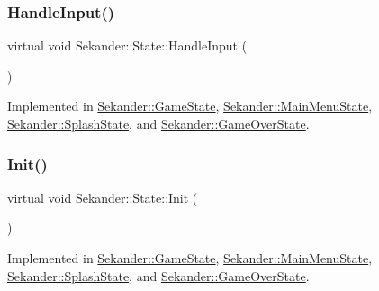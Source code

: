 \subsubsection{\texorpdfstring{Handle\+Input()}{HandleInput()}}
{\footnotesize\ttfamily virtual void Sekander\+::\+State\+::\+Handle\+Input (\begin{DoxyParamCaption}{ }\end{DoxyParamCaption})\hspace{0.3cm}{\ttfamily [pure virtual]}}



Implemented in \hyperlink{classSekander_1_1GameState_ab3e0961a77a513cdc49fe8e6b3962280}{Sekander\+::\+Game\+State}, \hyperlink{classSekander_1_1MainMenuState_a960cd5207d1869e28d6388e267672397}{Sekander\+::\+Main\+Menu\+State}, \hyperlink{classSekander_1_1SplashState_a70b45699149208c755d95d1ef3bdb202}{Sekander\+::\+Splash\+State}, and \hyperlink{classSekander_1_1GameOverState_ade27fc3af036b3c50df4ccf6cb795627}{Sekander\+::\+Game\+Over\+State}.

\mbox{\label{classSekander_1_1State_a171be4b77d4c13e01849b867bd3fa8f5}} 
\subsubsection{\texorpdfstring{Init()}{Init()}}
{\footnotesize\ttfamily virtual void Sekander\+::\+State\+::\+Init (\begin{DoxyParamCaption}{ }\end{DoxyParamCaption})\hspace{0.3cm}{\ttfamily [pure virtual]}}



Implemented in \hyperlink{classSekander_1_1GameState_af27f06a5535b1fbc2f52299a1eb3bee2}{Sekander\+::\+Game\+State}, \hyperlink{classSekander_1_1MainMenuState_a45ea852b4aa57ee6c6204da1262c5e91}{Sekander\+::\+Main\+Menu\+State}, \hyperlink{classSekander_1_1SplashState_adefc71fa2623180deda8391d4e64b04c}{Sekander\+::\+Splash\+State}, and \hyperlink{classSekander_1_1GameOverState_a1f0b4815da9cfb5221f2e3374b003de0}{Sekander\+::\+Game\+Over\+State}.

\mbox{\label{classSekander_1_1State_a08d49e399db6f68247f410f7fddc7963}} 
